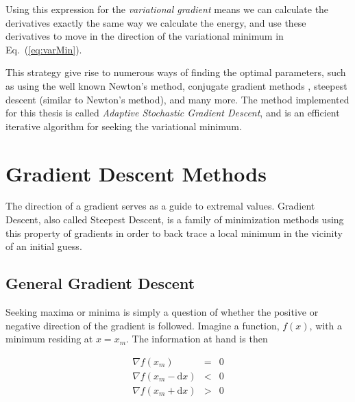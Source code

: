 
Using this expression for the \textit{variational gradient} means we can calculate the derivatives exactly the same way we calculate the energy, and use these derivatives to move in the direction of the variational minimum in Eq.~(\ref{eq:varMin}). 

This strategy give rise to numerous ways of finding the optimal parameters, such as using the well known Newton's method, conjugate gradient methods \cite{golub1996matrix}, steepest descent (similar to Newton's method), and many more. 
The method implemented for this thesis is called \textit{Adaptive Stochastic Gradient Descent}, and is an efficient iterative algorithm for seeking the variational minimum. 

\section{Gradient Descent Methods}

The direction of a gradient serves as a guide to extremal values. Gradient Descent, also called Steepest Descent, is a family of minimization methods using this property of gradients in order to back trace a local minimum in the vicinity of an initial guess. 

\subsection{General Gradient Descent}

Seeking maxima or minima is simply a question of whether the positive or negative direction of the gradient is followed.
Imagine a function, $f(x)$, with a minimum residing at $x=x_m$. The information at hand is then

\begin{eqnarray}
 \nabla f(x_m) &=& 0 \\
 \nabla f(x_m - \mathrm{d}x) &<& 0 \\
  \nabla f(x_m + \mathrm{d}x) &>& 0
\end{eqnarray}

